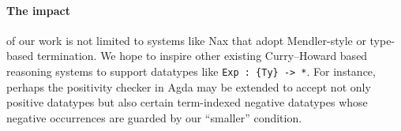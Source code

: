 \documentclass[a4paper]{easychair} %
\begin{document}
\paragraph{The impact\!\!} of our work is not limited to
systems like Nax that adopt Mendler-style or type-based termination.
We hope to inspire other existing Curry--Howard based reasoning systems
to support datatypes like \texttt{Exp\,:\,\{Ty\}\,->\,*}.
For instance, perhaps the positivity checker in Agda may be extended to accept
not only positive datatypes but also certain term-indexed negative datatypes
whose negative occurrences are guarded by our ``smaller'' condition.
\vspace{-1ex}
\end{document}
